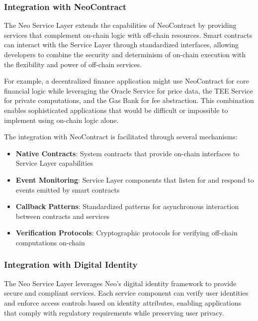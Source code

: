 

\subsubsection{Integration with NeoContract}
\label{subsubsec:neocontract-integration}

The Neo Service Layer extends the capabilities of NeoContract by providing services that complement on-chain logic with off-chain resources. Smart contracts can interact with the Service Layer through standardized interfaces, allowing developers to combine the security and determinism of on-chain execution with the flexibility and power of off-chain services.

For example, a decentralized finance application might use NeoContract for core financial logic while leveraging the Oracle Service for price data, the TEE Service for private computations, and the Gas Bank for fee abstraction. This combination enables sophisticated applications that would be difficult or impossible to implement using on-chain logic alone.

The integration with NeoContract is facilitated through several mechanisms:

\begin{itemize}
    \item \textbf{Native Contracts}: System contracts that provide on-chain interfaces to Service Layer capabilities
    \item \textbf{Event Monitoring}: Service Layer components that listen for and respond to events emitted by smart contracts
    \item \textbf{Callback Patterns}: Standardized patterns for asynchronous interaction between contracts and services
    \item \textbf{Verification Protocols}: Cryptographic protocols for verifying off-chain computations on-chain
\end{itemize}

\subsubsection{Integration with Digital Identity}
\label{subsubsec:identity-integration}

The Neo Service Layer leverages Neo's digital identity framework to provide secure and compliant services. Each service component can verify user identities and enforce access controls based on identity attributes, enabling applications that comply with regulatory requirements while preserving user privacy.

